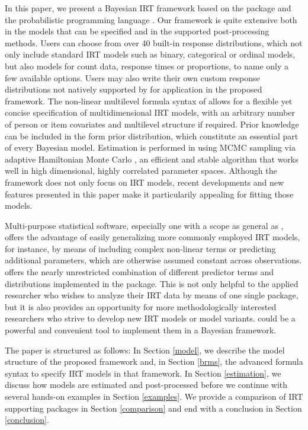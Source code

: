 \documentclass[jss]{jss}
\begin{document}
In this paper, we present a Bayesian IRT framework based on the
 package  \citep{brms1, brms2} and the
probabilistic programming language 
\citep{carpenter2017}. Our framework is quite extensive both in the
models that can be specified and in the supported post-processing
methods. Users can choose from over 40 built-in response distributions,
which not only include standard IRT models such as binary, categorical
or ordinal models, but also models for count data, response times or
proportions, to name only a few available options. Users may also write
their own custom response distributions not natively supported by
 for application in the proposed framework. The non-linear
multilevel formula syntax of  allows for a flexible yet
concise specification of multidimensional IRT models, with an arbitrary
number of person or item covariates and multilevel structure if
required. Prior knowledge can be included in the form prior
distribution, which constitute an essential part of every Bayesian
model. Estimation is performed in  using MCMC sampling
via adaptive Hamiltonian Monte Carlo \citep{hoffman2014, stanM2019}, an
efficient and stable algorithm that works well in high dimensional,
highly correlated parameter spaces. Although the  framework
does not only focus on IRT models, recent developments and new features
presented in this paper make it particularily appealing for fitting
those models.

Multi-purpose statistical software, especially one with a scope as
general as , offers the advantage of easily generalizing more
commonly employed IRT models, for instance, by means of including
complex non-linear terms or predicting additional parameters, which are
otherwise assumed constant across observations.  offers the
nearly unrestricted combination of different predictor terms and
distributions implemented in the package. This is not only helpful to
the applied researcher who wishes to analyze their IRT data by means of
one single package, but it is also provides an opportunity for more
methodologically interested researchers who strive to develop new IRT
models or model variants.  could be a powerful and convenient
tool to implement them in a Bayesian framework.

The paper is structured as follows: In Section \ref{model}, we describe
the model structure of the proposed framework and, in Section
\ref{brms}, the advanced  formula syntax to specify IRT
models in that framework. In Section \ref{estimation}, we discuss how
models are estimated and post-processed before we continue with several
hands-on examples in Section \ref{examples}. We provide a comparison of
IRT supporting  packages in Section \ref{comparison} and end
with a conclusion in Section \ref{conclusion}.
\end{document}
